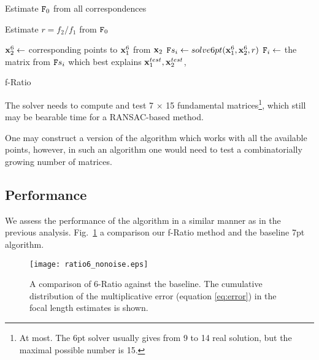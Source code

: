 \begin{algorithm}[H]
\SetAlgoNoLine
\LinesNotNumbered
{}
 \Begin
    {Estimate $\mathtt{F}_0$ from all correspondences\;
    
    Estimate $r=f_2 \slash f_1$ from $\mathtt{F}_0$ \;
    
        {
        $\mathbf{x}_2^6 \leftarrow$ corresponding points to $\mathbf{x}_1^6$ from $\mathbf{x}_2$ \;
        $\mathtt{F}s_i \leftarrow solve6pt(\mathbf{x}_1^6,\mathbf{x}_2^6,r)$\;
        $\mathtt{F}_i \leftarrow$ the matrix from $ \mathtt{F}s_i$ which best explains $\mathbf{x}_1^{test}, \mathbf{x}_2^{test}$,
        }
        
    }
 \caption{f-Ratio}
 \label{f-Ratio}
\end{algorithm}

The solver needs to compute and test 7 $\times$ 15 fundamental matrices\footnote{At most. The 6pt solver usually gives from 9 to 14 real solution, but the maximal possible number is 15. }, which still may be bearable time for a RANSAC-based method. 

One may construct a version of the algorithm which works with all the available points, however,  in such an algorithm one would need to test a combinatorially growing number of matrices.

\subsection{Performance}

We assess the performance of the algorithm in a similar manner as in the previous analysis. Fig.~\ref{fratio_nonoise} a comparison our f-Ratio method and the baseline 7pt algorithm. 

\begin{figure}[h!]
  \begin{center}
    \texttt{[image: ratio6\_nonoise.eps]}
    \caption[Performance of f-Ratio]{A comparison of 6-Ratio against the baseline. The cumulative distribution of the  multiplicative error (equation \ref{eq:error})  in the focal  length  estimates is shown.}
    \label{fratio_nonoise}
  \end{center}
\end{figure}

